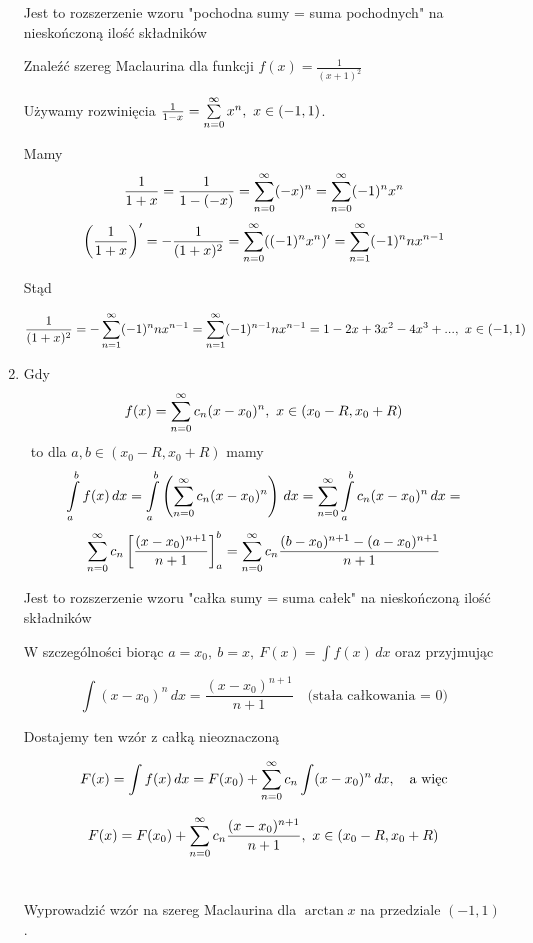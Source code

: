 \begin{enumerate}
    Jest to rozszerzenie wzoru "pochodna sumy = suma pochodnych" na nieskończoną ilość składników \\

    \begin{przyklad}

    Znaleźć szereg Maclaurina dla funkcji $ f(x) = \frac{1}{(x+1)^2} $

    Używamy rozwinięcia $ \frac{1}{1-x} = \sum\limits_{n = 0}^{\infty} x^n, \ x \in (-1, 1) $.
    
    Mamy
    $$ \frac{1}{1+x} = \frac{1}{1-(-x)} = \sum\limits_{n = 0}^{\infty} (-x)^n = \sum\limits_{n = 0}^{\infty} (-1)^n x^n $$
    $$ \left( \frac{1}{1+x} \right)' = - \frac{1}{(1+x)^2} = \sum\limits_{n = 0}^{\infty} ((-1)^n x^n)' = \sum\limits_{n = 1}^{\infty} (-1)^n n x^{n-1} $$

    Stąd

    $$ \frac{1}{(1+x)^2} = - \sum\limits_{n = 1}^{\infty} (-1)^n n x^{n-1} = \sum\limits_{n = 1}^{\infty} (-1)^{n-1} n x^{n-1} = 1 - 2x + 3x^2 - 4x^3 + ..., \ x \in (-1, 1) $$
    \end{przyklad}

    \item Gdy $$ f(x) = \sum\limits_{n = 0}^{\infty} c_n(x - x_0)^n, \ x\in (x_0 - R, x_0 + R) $$ \ 
    to dla $ a,b \in (x_0 - R, x_0 + R) $ mamy
    $$ \int\limits_a^b f(x) \,dx = \int\limits_a^b \left( \sum\limits_{n = 0}^{\infty} c_n(x - x_0)^n \right) \,dx = \sum\limits_{n = 0}^{\infty} \int\limits_a^b c_n(x - x_0)^n \,dx = $$ 
    $$ \sum\limits_{n = 0}^{\infty} c_n \left[ \frac{(x - x_0)^{n+1}}{n+1} \right]_a^b = \sum\limits_{n = 0}^{\infty} c_n \frac{(b - x_0)^{n+1} - (a - x_0)^{n+1}}{n+1} $$

    Jest to rozszerzenie wzoru "całka sumy = suma całek" na nieskończoną ilość składników

    W szczególności biorąc $ a = x_0, \ b = x, \ F(x) = \int f(x) \,dx $ oraz przyjmując 

    $$ \int (x - x_0)^n \,dx = \frac{(x - x_0)^{n+1}}{n+1} \quad \textrm{(stała całkowania = 0)} $$

    Dostajemy ten wzór z całką nieoznaczoną

    $$ F(x) = \int f(x) \,dx = F(x_0) + \sum\limits_{n = 0}^{\infty} c_n \int (x - x_0)^n \,dx, \quad \textrm{a więc} $$

    $$ F(x) = F(x_0) + \sum\limits_{n = 0}^{\infty} c_n \frac{(x - x_0)^{n+1}}{n+1}, \ x\in (x_0 - R, x_0 + R) $$ \\

    \begin{przyklad}

    Wyprowadzić wzór na szereg Maclaurina dla $\arctan x$ na przedziale $(-1, 1)$. \\


\end{przyklad}
\end{enumerate}
